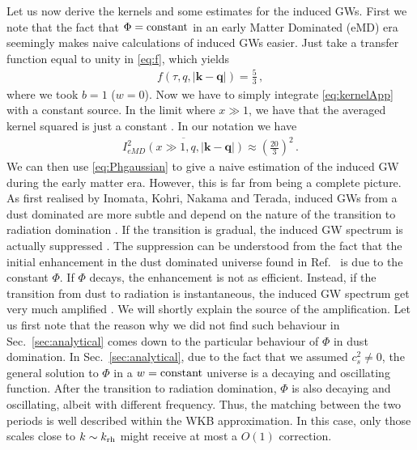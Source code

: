 \documentclass[a4paper,11pt]{article}
\numberwithin{equation}{section}
\begin{document}
Let us now derive the kernels and some estimates for the induced GWs. First we note that the fact that $\Phi={\rm constant}$ in an early Matter Dominated (eMD) era seemingly makes naive calculations of induced GWs easier. Just take a transfer function equal to unity in \eqref{eq:f}, which yields
\begin{align}
f(\tau,q,|\mathbf{k}-\mathbf{q}|)=\frac{5}{3}\,,
\end{align}
where we took $b=1$ ($w=0$). Now we have to simply integrate \eqref{eq:kernelApp} with a constant source. In the limit where $x\gg1$, we have that the averaged kernel squared is just a constant \cite{Assadullahi:2009nf,Kohri:2018awv}. In our notation we have
\begin{align}\label{eq:IeMD}
\overline{I^2_{eMD}(x\gg1,q,|\mathbf{k}-\mathbf{q}|)}\approx \left(\frac{20}{3}\right)^2\,.
\end{align}
We can then use \eqref{eq:Phgaussian} to give a naive estimation of the induced GW during the early matter era. However, this is far from being a complete picture. As first realised by Inomata, Kohri, Nakama and Terada, induced GWs from a dust dominated are more subtle and depend on the nature of the transition to radiation domination \cite{Inomata:2019ivs,Inomata:2019zqy}. If the transition is gradual, the induced GW spectrum is actually suppressed \cite{Inomata:2019zqy}. The suppression can be understood from the fact that the initial enhancement in the dust dominated universe found in Ref.~\cite{Assadullahi:2009nf} is due to the constant $\Phi$. If $\Phi$ decays, the enhancement is not as efficient. Instead, if the transition from dust to radiation is instantaneous, the induced GW spectrum get very much amplified \cite{Inomata:2019ivs}. We will shortly explain the source of the amplification. Let us first note that the reason why we did not find such behaviour in Sec.~\ref{sec:analytical} comes down to the particular behaviour of $\Phi$ in dust domination. In Sec.~\ref{sec:analytical}, due to the fact that we assumed $c_s^2\neq0$, the general solution to $\Phi$ in a $w={\rm constant}$ universe is a decaying and oscillating function. After the transition to radiation domination, $\Phi$ is also decaying and oscillating, albeit with different frequency. Thus, the matching between the two periods is well described within the WKB approximation. In this case, only those scales close to $k\sim k_{\rm rh}$ might receive at most a $O(1)$ correction. 
\end{document}
